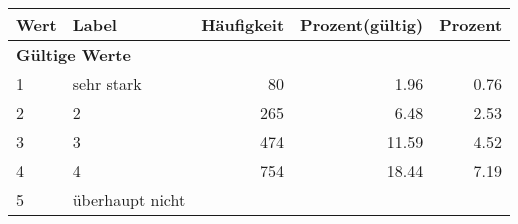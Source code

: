      \begin{longtable}{lXrrr}
     \toprule
     \textbf{Wert} & \textbf{Label} & \textbf{Häufigkeit} & \textbf{Prozent(gültig)} & \textbf{Prozent} \\
     \endhead
     \midrule
     \multicolumn{5}{l}{\textbf{Gültige Werte}}\\

     1 &
     \multicolumn{1}{X}{ sehr stark   } &


       \num{80} &
       \num[round-mode=places,round-precision=2]{1.96} &
         \num[round-mode=places,round-precision=2]{0.76} \\

     2 &
     \multicolumn{1}{X}{ 2   } &


       \num{265} &
       \num[round-mode=places,round-precision=2]{6.48} &
         \num[round-mode=places,round-precision=2]{2.53} \\

     3 &
     \multicolumn{1}{X}{ 3   } &


       \num{474} &
       \num[round-mode=places,round-precision=2]{11.59} &
         \num[round-mode=places,round-precision=2]{4.52} \\

     4 &
     \multicolumn{1}{X}{ 4   } &


       \num{754} &
       \num[round-mode=places,round-precision=2]{18.44} &
         \num[round-mode=places,round-precision=2]{7.19} \\

     5 &
     \multicolumn{1}{X}{ überhaupt nicht   } &



\end{longtable}
